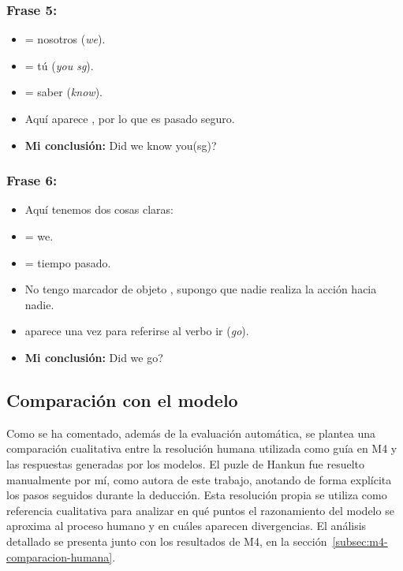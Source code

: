 \subsubsection*{Frase 5: \footnotesize{}}

\begin{itemize}
	\item {} = nosotros (\textit{we}).
	
	\item {} = tú (\textit{you sg}).
	
	\item {} = saber (\textit{know}).
	
	\item Aquí aparece , por lo que es pasado seguro.
	
	\item \textbf{Mi conclusión:} Did we know you(sg)?
\end{itemize}

\subsubsection*{Frase 6: \footnotesize{}}

\begin{itemize}
	\item Aquí tenemos dos cosas claras:
	
	\item {} = we.
	
	\item {} = tiempo pasado.
	
	\item No tengo marcador de objeto , supongo que nadie realiza la acción hacia nadie.
	
	\item {} aparece una vez para referirse al verbo ir (\textit{go}).
	
	\item \textbf{Mi conclusión:} Did we go?
\end{itemize}

\subsection{Comparación con el modelo}

Como se ha comentado, además de la evaluación automática, se plantea una comparación cualitativa entre la resolución humana utilizada como guía en M4 y las respuestas generadas por los modelos. El puzle de Hankun fue resuelto manualmente por mí, como autora de este trabajo, anotando de forma explícita los pasos seguidos durante la deducción. Esta resolución propia se utiliza como referencia cualitativa para analizar en qué puntos el razonamiento del modelo se aproxima al proceso humano y en cuáles aparecen divergencias. El análisis detallado se presenta junto con los resultados de M4, en la sección~\ref{subsec:m4-comparacion-humana}.